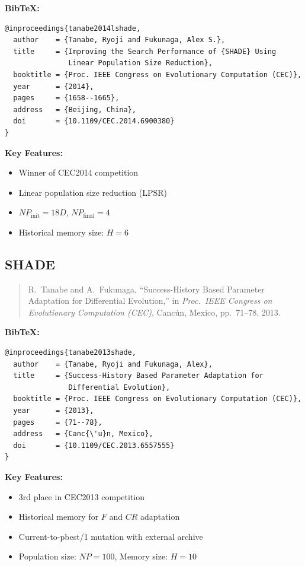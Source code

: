 \documentclass[11pt]{article}
\begin{document}
\noindent\textbf{BibTeX:}
\begin{verbatim}
@inproceedings{tanabe2014lshade,
  author    = {Tanabe, Ryoji and Fukunaga, Alex S.},
  title     = {Improving the Search Performance of {SHADE} Using 
               Linear Population Size Reduction},
  booktitle = {Proc. IEEE Congress on Evolutionary Computation (CEC)},
  year      = {2014},
  pages     = {1658--1665},
  address   = {Beijing, China},
  doi       = {10.1109/CEC.2014.6900380}
}
\end{verbatim}

\noindent\textbf{Key Features:}
\begin{itemize}
    \item Winner of CEC2014 competition
    \item Linear population size reduction (LPSR)
    \item $NP_{\text{init}} = 18D$, $NP_{\text{final}} = 4$
    \item Historical memory size: $H = 6$
\end{itemize}

\subsection{SHADE}

\begin{quote}
R.~Tanabe and A.~Fukunaga, 
``Success-History Based Parameter Adaptation for Differential Evolution,'' 
in \textit{Proc.~IEEE Congress on Evolutionary Computation (CEC)}, 
Canc\'{u}n, Mexico, pp.~71--78, 2013.
\end{quote}

\noindent\textbf{BibTeX:}
\begin{verbatim}
@inproceedings{tanabe2013shade,
  author    = {Tanabe, Ryoji and Fukunaga, Alex},
  title     = {Success-History Based Parameter Adaptation for 
               Differential Evolution},
  booktitle = {Proc. IEEE Congress on Evolutionary Computation (CEC)},
  year      = {2013},
  pages     = {71--78},
  address   = {Canc{\'u}n, Mexico},
  doi       = {10.1109/CEC.2013.6557555}
}
\end{verbatim}

\noindent\textbf{Key Features:}
\begin{itemize}
    \item 3rd place in CEC2013 competition
    \item Historical memory for $F$ and $CR$ adaptation
    \item Current-to-pbest/1 mutation with external archive
    \item Population size: $NP = 100$, Memory size: $H = 10$
\end{itemize}
\end{document}
